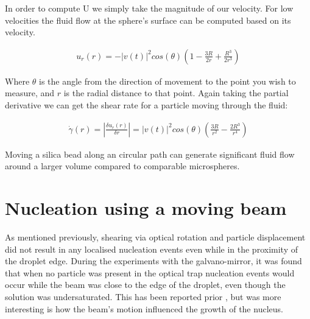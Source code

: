 In order to compute U we simply take the magnitude of our velocity. 
For low velocities the fluid flow at the sphere's surface can be computed 
based on its velocity.

\begin{align}
	u_r(r)=-|v(t)|^2cos(\theta)\left(1-\frac{3R}{2r}+\frac{R^3}{2r^3}\right)
\end{align}

Where $\theta$ is the angle from the direction of movement to the point
you wish to measure, and $r$ is the radial distance to that point. Again
taking the partial derivative we can get the shear rate for a particle moving 
through the fluid:

\begin{align}
	\dot{\gamma}(r) = \left| \frac{\delta u_r(r)}{\delta r}\right| = |v(t)|^2cos(\theta)\left(\frac{3R}{r^2} -\frac{2R^3}{r^4} \right)
\end{align}

Moving a silica bead along an circular path can generate significant fluid 
flow around a larger volume compared to comparable microspheres.

\section{Nucleation using a moving beam}
As mentioned previously, shearing via optical rotation and particle displacement
did not result in any localised nucleation events even while in the proximity of 
the droplet edge. During the experiments with the galvano-mirror, it was found 
that when no particle was present in the optical trap nucleation events would 
occur while the beam was close to the edge of the droplet, even though the solution
was undersaturated. This has been reported prior \cite{Rungsimanon2010, Liao2022}, 
but was more interesting is how the beam's motion influenced the growth of the nucleus.

